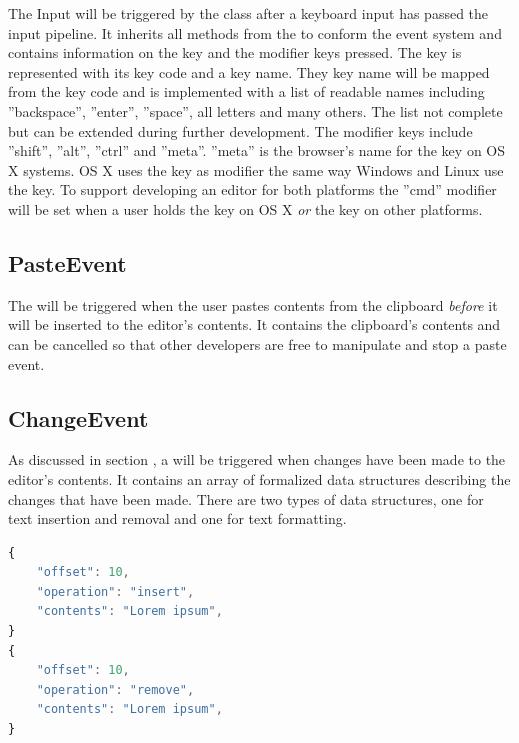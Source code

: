 The Input  will be triggered by the  class after a keyboard input has passed the input pipeline. It inherits all methods from the  to conform the event system and contains information on the key and the modifier keys pressed. The key is represented with its key code and a key name. They key name will be mapped from the key code and is implemented with a list of readable names including ''backspace'', ''enter'', ''space'', all letters and many others. The list not complete but can be extended during further development. The modifier keys include ''shift'', ''alt'', ''ctrl'' and ''meta''. ''meta'' is the browser's name for the  key on OS X systems. OS X uses the  key as modifier the same way Windows and Linux use the  key. To support developing an editor for both platforms the ''cmd'' modifier will be set when a user holds the  key on OS X \textit{or} the  key on other platforms.

\subsection{PasteEvent}
\label{subsec:paste_event}

The  will be triggered when the user pastes contents from the clipboard \textit{before} it will be inserted to the editor's contents. It contains the clipboard's contents and can be cancelled so that other developers are free to manipulate and stop a paste event.

\subsection{ChangeEvent}
\label{subsec:change_event}

As discussed in section , a  will be triggered when changes have been made to the editor's contents. It contains an array of formalized data structures describing the changes that have been made. There are two types of data structures, one for text insertion and removal and one for text formatting.

\begin{lstlisting}[language=JavaScript, caption={Data structure for insert and remove operations}, label=lst:add_remove_structure]
{
    "offset": 10,
    "operation": "insert",
    "contents": "Lorem ipsum",
}
{
    "offset": 10,
    "operation": "remove",
    "contents": "Lorem ipsum",
}
\end{lstlisting}


